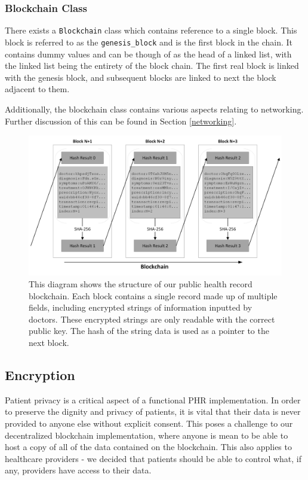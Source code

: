 \documentclass{article}
\begin{document}
\subsubsection{Blockchain Class}
There exists a \texttt{Blockchain} class which contains reference to a single block. This block is referred to as the \texttt{genesis\_block} and is the first block in the chain. It contains dummy values and can be though of as the head of a linked list, with the linked list being the entirety of the block chain. The first real block is linked with the genesis block, and subsequent blocks are linked to next the block adjacent to them.

Additionally, the blockchain class contains various aspects relating to networking. Further discussion of this can be found in Section \ref{networking}. 

\begin{figure}[h]
\centering
\includegraphics[width=\textwidth]{images/4990_blockchain_structure.png}
\caption{This diagram shows the structure of our public health record blockchain. Each block contains a single record made up of multiple fields, including encrypted strings of information inputted by doctors. These encrypted strings are only readable with the correct public key. The hash of the string data is used as a pointer to the next block.}
\label{fig:encryption_encryption}
\end{figure}

\subsection{Encryption}
Patient privacy is a critical aspect of a functional PHR implementation. In order to preserve the dignity and privacy of patients, it is vital that their data is never provided to anyone else without explicit consent. This poses a challenge to our decentralized blockchain implementation, where anyone is mean to be able to host a copy of all of the data contained on the blockchain. This also applies to healthcare providers - we decided that patients should be able to control what, if any, providers have access to their data.
\end{document}
